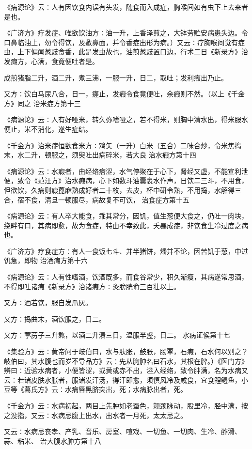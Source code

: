 \documentclass[a4paper,12pt,UTF8,twoside]{ctexbook}
\begin{document}
《病源论》云∶人有因饮食内误有头发，随食而入成症，胸喉间如有虫下上去来者是也。

《广济方》疗发症、唯欲饮油方∶油一升，上香泽煎之，大钵劳贮安病患头边。令口鼻临油上，勿令得饮，及敷鼻面，并令香症出形为病。）又云∶疗胸喉间觉有症虫，上下偏闻葱豉食香，此是发虫故也，油煎葱豉置口边，行术二日《新录方》治发瘕方，心满，食竟便吐者是。

成煎猪脂二升，酒二升，煮三沸，一服一升，日二，取吐；发利瘕出乃止。

又方∶饮白马尿八合，日一，瘥止，发瘕令食竟便吐，余瘕则不然。（以上《千金方》同之
治米症方第十三

《病源论》云∶人有好哑米，转久弥嗜哑之，若不得米，则胸中清水出，得米服水便止，米不消化，遂生症结。

《千金方》治米症恒欲食米方∶鸡矢（一升）白米（五合）二味合炒，令米焦捣末，水二升，顿服之，须臾吐出病碎米，若大良
治水瘕方第十四

《病源论》云∶水瘕者，由经络痞涩，水气停聚在于心下，肾经又虚，不能宣利泄便，致令《范汪方》治水瘕病，心下如数斗油囊裹水作声，日饮二三斗，不用食，但欲饮，久病则瘕蓖麻熟成好者二十枚，去皮，杯中研令熟，不用捣，水解得三合，宿不食，清旦一顿服尽，病故复不可饮，
治食症方第十五

《病源论》云∶有人卒大能食，乖其常分，因饥，值生葱便大食之，仍吐一肉块，绕畔有口，其病即愈，故为食症，特由不幸致此，夭暴成症，非饮食生冷过度之病也。

《广济方》疗食症方∶有人一食饭七斗、并半猪饼，燔并不论，因苦饥于葱，中过饥急，即物
治酒瘕方第十六

《病源论》云∶人有性嗜酒，饮酒既多，而食谷常少，积久渐瘦，其病遂常思酒，不得即吐诸瘕《新录方》治诸瘕方∶灸膀胱俞三百壮以上。

又方∶酒若饮，服自发爪灰。

又方∶捣曲末，酒饮服之，日二。

又方∶葶苈子三升熬，以酒二升渍三日，温服半盏，日二。
水病证候第十七

《集验方》云∶黄帝问于岐伯曰，水与肤胀，鼓胀，肠覃，石瘕，石水何以别之？岐伯曰，其水腹也而岁不导品方》云∶先从胸肿名曰石水，其根在脾。）《医门方》辨曰∶近验水病者，小便皆涩，或黄或赤不出，溢入经络，致令肿满，名为水病又云∶若诸皮肤水胀者，服诸发汗汤，得汗即愈，须慎风冷及咸食，宜食鲤鳢鱼，小豆等《葛氏方》云∶水病唇黑脐突出，死；水病脉出者，死。

《千金方》云∶水病初起，两目上先肿如老蚕色，颊颈脉动，股里冷，胫中满，按之没指，又云∶水病忌腹上出水，出水者一月死，太太忌之。

又云∶水病忌丧孝、产乳、音乐、房室、喧戏、一切鱼、一切肉、生冷、酢滑、蒜、粘米、
治大腹水肿方第十八
\end{document}
